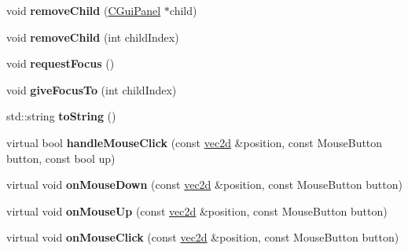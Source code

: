 \begin{DoxyCompactItemize}
\item 
\hypertarget{class_c_gui_panel_a2fa0ad948093e943680322b5d84f804d}{
void {\bfseries removeChild} (\hyperlink{class_c_gui_panel}{CGuiPanel} $\ast$child)}
\label{class_c_gui_panel_a2fa0ad948093e943680322b5d84f804d}

\item 
\hypertarget{class_c_gui_panel_a431062f161b423d13770a096c080c8ad}{
void {\bfseries removeChild} (int childIndex)}
\label{class_c_gui_panel_a431062f161b423d13770a096c080c8ad}

\item 
\hypertarget{class_c_gui_panel_a65062f92bdd115bd3f813c3942c6559a}{
void {\bfseries requestFocus} ()}
\label{class_c_gui_panel_a65062f92bdd115bd3f813c3942c6559a}

\item 
\hypertarget{class_c_gui_panel_a08146fc2fbdd2dea78910fab4870ca4d}{
void {\bfseries giveFocusTo} (int childIndex)}
\label{class_c_gui_panel_a08146fc2fbdd2dea78910fab4870ca4d}

\item 
\hypertarget{class_c_gui_panel_aba1b1f8c939b6c819e5ddc959d5b4b45}{
std::string {\bfseries toString} ()}
\label{class_c_gui_panel_aba1b1f8c939b6c819e5ddc959d5b4b45}

\item 
\hypertarget{class_c_gui_panel_a194286d63943947587d46e67e55e7e52}{
virtual bool {\bfseries handleMouseClick} (const \hyperlink{classvec2d}{vec2d} \&position, const MouseButton button, const bool up)}
\label{class_c_gui_panel_a194286d63943947587d46e67e55e7e52}

\item 
\hypertarget{class_c_gui_panel_a4dd62e0da2f58fad3794fbf717643120}{
virtual void {\bfseries onMouseDown} (const \hyperlink{classvec2d}{vec2d} \&position, const MouseButton button)}
\label{class_c_gui_panel_a4dd62e0da2f58fad3794fbf717643120}

\item 
\hypertarget{class_c_gui_panel_abf7853cd073e085b4d209e046d32d1f4}{
virtual void {\bfseries onMouseUp} (const \hyperlink{classvec2d}{vec2d} \&position, const MouseButton button)}
\label{class_c_gui_panel_abf7853cd073e085b4d209e046d32d1f4}

\item 
\hypertarget{class_c_gui_panel_a09fb5f540e9177499be17f68d67d5d47}{
virtual void {\bfseries onMouseClick} (const \hyperlink{classvec2d}{vec2d} \&position, const MouseButton button)}
\label{class_c_gui_panel_a09fb5f540e9177499be17f68d67d5d47}


\end{DoxyCompactItemize}
